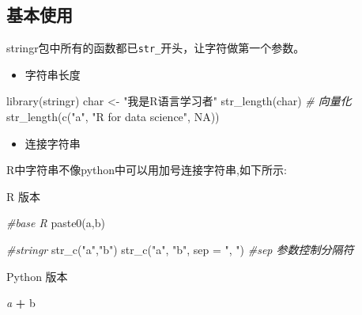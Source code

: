 \documentclass[
]{book}
\newenvironment{Shaded}{\begin{snugshade}}{\end{snugshade}}
\newcommand{\AttributeTok}[1]{\textcolor[rgb]{0.77,0.63,0.00}{#1}}
\newcommand{\CommentTok}[1]{\textcolor[rgb]{0.56,0.35,0.01}{\textit{#1}}}
\newcommand{\ConstantTok}[1]{\textcolor[rgb]{0.00,0.00,0.00}{#1}}
\newcommand{\FunctionTok}[1]{\textcolor[rgb]{0.00,0.00,0.00}{#1}}
\newcommand{\NormalTok}[1]{#1}
\newcommand{\OperatorTok}[1]{\textcolor[rgb]{0.81,0.36,0.00}{\textbf{#1}}}
\newcommand{\OtherTok}[1]{\textcolor[rgb]{0.56,0.35,0.01}{#1}}
\newcommand{\StringTok}[1]{\textcolor[rgb]{0.31,0.60,0.02}{#1}}
\providecommand{\tightlist}{%
  \setlength{\itemsep}{0pt}\setlength{\parskip}{0pt}}
\begin{document}
\hypertarget{ux57faux672cux4f7fux7528}{%
\subsection{基本使用}\label{ux57faux672cux4f7fux7528}}

stringr包中所有的函数都已\texttt{str\_}开头，让字符做第一个参数。

\begin{itemize}
\tightlist
\item
  字符串长度
\end{itemize}

\begin{Shaded}
\begin{Highlighting}[]
\FunctionTok{library}\NormalTok{(stringr)}
\NormalTok{char }\OtherTok{\textless{}{-}} \StringTok{"我是R语言学习者"}
\FunctionTok{str\_length}\NormalTok{(char)}
\CommentTok{\# 向量化}
\FunctionTok{str\_length}\NormalTok{(}\FunctionTok{c}\NormalTok{(}\StringTok{"a"}\NormalTok{, }\StringTok{"R for data science"}\NormalTok{, }\ConstantTok{NA}\NormalTok{))}
\end{Highlighting}
\end{Shaded}

\begin{itemize}
\tightlist
\item
  连接字符串
\end{itemize}

R中字符串不像python中可以用加号连接字符串,如下所示:

R 版本

\begin{Shaded}
\begin{Highlighting}[]
\CommentTok{\#base R}
\FunctionTok{paste0}\NormalTok{(}\StringTok{\textquotesingle{}a\textquotesingle{}}\NormalTok{,}\StringTok{\textquotesingle{}b\textquotesingle{}}\NormalTok{)}

\CommentTok{\#stringr}
\FunctionTok{str\_c}\NormalTok{(}\StringTok{"a"}\NormalTok{,}\StringTok{"b"}\NormalTok{)}
\FunctionTok{str\_c}\NormalTok{(}\StringTok{"a"}\NormalTok{, }\StringTok{"b"}\NormalTok{, }\AttributeTok{sep =} \StringTok{", "}\NormalTok{) }\CommentTok{\#sep 参数控制分隔符}
\end{Highlighting}
\end{Shaded}

Python 版本

\begin{Shaded}
\begin{Highlighting}[]
\CommentTok{\textquotesingle{}a\textquotesingle{}} \OperatorTok{+} \StringTok{\textquotesingle{}b\textquotesingle{}}
\end{Highlighting}
\end{Shaded}
\end{document}
